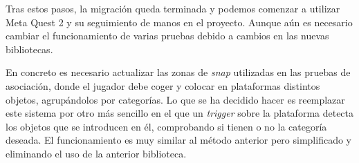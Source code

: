 Tras estos pasos, la migración queda terminada y podemos comenzar a utilizar Meta Quest 2 y su seguimiento de manos en el proyecto. Aunque aún es necesario cambiar el funcionamiento de varias pruebas debido a cambios en las nuevas bibliotecas.


En concreto es necesario actualizar las zonas de \textit{snap} utilizadas en las pruebas de asociación, donde el jugador debe coger y colocar en plataformas distintos objetos, agrupándolos por categorías. Lo que se ha decidido hacer es reemplazar este sistema por otro más sencillo en el que un \textit{trigger} sobre la plataforma detecta los objetos que se introducen en él, comprobando si tienen o no la categoría deseada. El funcionamiento es muy similar al método anterior pero simplificado y eliminando el uso de la anterior biblioteca.














